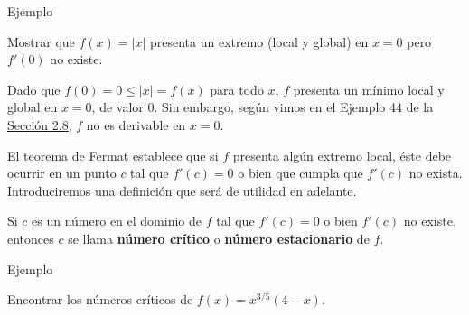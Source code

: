 \documentclass[
  letterpaper,
]{book}
\theoremstyle{plain}
\theoremstyle{remark}
\begin{document}
Ejemplo

Mostrar que \(f(x)=|x|\) presenta un extremo (local y global) en \(x=0\)
pero \(f'(0)\) no existe.

\begin{tcolorbox}[enhanced jigsaw, opacityback=0, left=2mm, opacitybacktitle=0.6, toprule=.15mm, bottomrule=.15mm, colbacktitle=quarto-callout-tip-color!10!white, titlerule=0mm, bottomtitle=1mm, title=\textcolor{quarto-callout-tip-color}{\faLightbulb}\hspace{0.5em}{Solución}, toptitle=1mm, colframe=quarto-callout-tip-color-frame, colback=white, breakable, rightrule=.15mm, arc=.35mm, leftrule=.75mm, coltitle=black]

Dado que \(f(0)=0\leq |x|=f(x)\) para todo \(x\), \(f\) presenta un
mínimo local y global en \(x=0\), de valor 0. Sin embargo, según vimos
en el Ejemplo 44 de la \hyperref[seccion_2.8]{Sección 2.8}, \(f\) no es
derivable en \(x=0\).

\end{tcolorbox}

El teorema de Fermat establece que si \(f\) presenta algún extremo
local, éste debe ocurrir en un punto \(c\) tal que \(f'(c)=0\) o bien
que cumpla que \(f'(c)\) no exista. Introduciremos una definición que
será de utilidad en adelante.

\begin{tcolorbox}[enhanced jigsaw, opacityback=0, left=2mm, opacitybacktitle=0.6, toprule=.15mm, bottomrule=.15mm, colbacktitle=quarto-callout-note-color!10!white, titlerule=0mm, bottomtitle=1mm, title=\textcolor{quarto-callout-note-color}{\faInfo}\hspace{0.5em}{Definición (Número crítico)}, toptitle=1mm, colframe=quarto-callout-note-color-frame, colback=white, breakable, rightrule=.15mm, arc=.35mm, leftrule=.75mm, coltitle=black]

Si \(c\) es un número en el dominio de \(f\) tal que \(f'(c)=0\) o bien
\(f'(c)\) no existe, entonces \(c\) se llama \textbf{número crítico} o
\textbf{número estacionario} de \(f\).

\end{tcolorbox}

Ejemplo

Encontrar los números críticos de \(f(x)=x^{3/5}(4-x)\).
\end{document}
